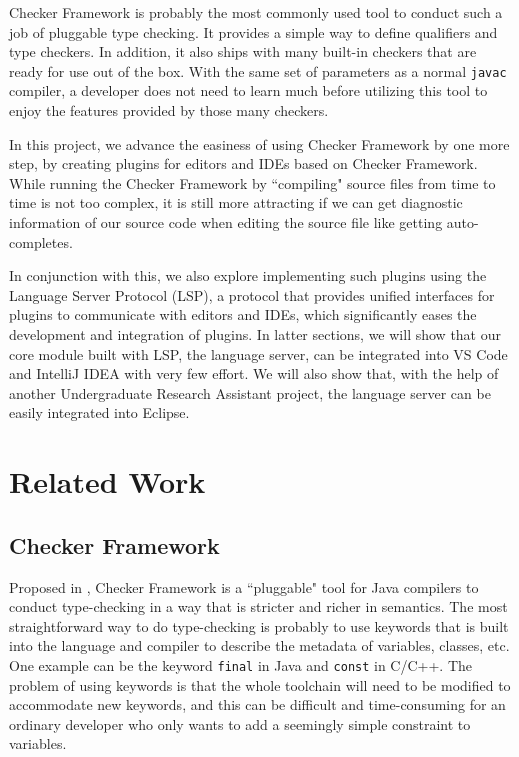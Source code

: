 \documentclass{article}
\begin{document}
Checker Framework\cite{cf} is probably the most commonly used tool to conduct
such a job of pluggable type checking. It provides a simple way to define
qualifiers and type checkers. In addition, it also ships with many built-in
checkers that are ready for use out of the box. With the same set of parameters
as a normal \verb|javac| compiler, a developer does not need to learn much
before utilizing this tool to enjoy the features provided by those many
checkers.

In this project, we advance the easiness of using Checker Framework by one more
step, by creating plugins for editors and IDEs based on Checker Framework. While
running the Checker Framework by ``compiling" source files from time to time is
not too complex, it is still more attracting if we can get diagnostic
information of our source code when editing the source file like getting
auto-completes.

In conjunction with this, we also explore implementing such plugins using the
Language Server Protocol (LSP)\cite{lsp}, a protocol that provides unified
interfaces for plugins to communicate with editors and IDEs, which significantly
eases the development and integration of plugins. In latter sections, we will
show that our core module built with LSP, the language server, can be integrated
into VS Code and IntelliJ IDEA with very few effort. We will also show that,
with the help of another Undergraduate Research Assistant project, the language
server can be easily integrated into Eclipse.


\section{Related Work}

\subsection{Checker Framework}

Proposed in \cite{cf-ori}, Checker Framework is a ``pluggable" tool for Java
compilers to conduct type-checking in a way that is stricter and richer in
semantics. The most straightforward way to do type-checking is probably to use
keywords that is built into the language and compiler to describe the metadata
of variables, classes, etc. One example can be the keyword \verb|final| in Java
and \verb|const| in C/C++. The problem of using keywords is that the whole
toolchain will need to be modified to accommodate new keywords, and this can be
difficult and time-consuming for an ordinary developer who only wants to add a
seemingly simple constraint to variables.
\end{document}
